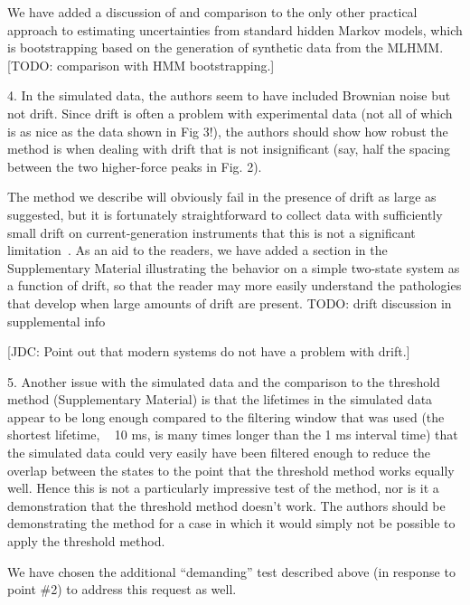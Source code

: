 \documentclass[ucb,qb3,10pt,fullfrom]{ucletter}
\begin{document}
\begin{letter}{}
We have added a discussion of and comparison to the only other practical approach to estimating uncertainties from standard hidden Markov models, which is bootstrapping based on the generation of synthetic data from the MLHMM. {\color{blue} [TODO: comparison with HMM bootstrapping.]}

\color{red}
4. In the simulated data, the authors seem to have included Brownian noise but not drift. Since drift is often a problem with experimental data (not all of which is as nice as the data shown in Fig 3!), the authors should show how robust the method is when dealing with drift that is not insignificant (say, half the spacing between the two higher-force peaks in Fig. 2).
\color{black}

The method we describe will obviously fail in the presence of drift as large as suggested, but it is fortunately straightforward to collect data with sufficiently small drift on current-generation instruments that this is not a significant limitation~\cite{bustamante:csh-protocols:2009:optical-tweezers}.
As an aid to the readers, we have added a section in the Supplementary Material illustrating the behavior on a simple two-state system as a function of drift, so that the reader may more easily understand the pathologies that develop when large amounts of drift are present. {\color{blue} TODO: drift discussion in supplemental info}

{\color{blue}[JDC: Point out that modern systems do not have a problem with drift.]}

\color{red}
5. Another issue with the simulated data and the comparison to the threshold method (Supplementary Material) is that the lifetimes in the simulated data appear to be long enough compared to the filtering window that was used (the shortest lifetime, ~ 10 ms, is many times longer than the 1 ms interval time) that the simulated data could very easily have been filtered enough to reduce the overlap between the states to the point that the threshold method works equally well. Hence this is not a particularly impressive test of the method, nor is it a demonstration that the threshold method doesn't work. The authors should be demonstrating the method for a case in which it would simply not be possible to apply the threshold method.
\color{black}

We have chosen the additional ``demanding'' test described above (in response to point \#2) to address this request as well.


\end{letter}
\end{document}
